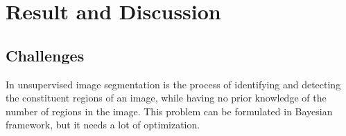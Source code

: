 \chapter{Result and Discussion}
\label{chap:result}
\section{Challenges}
In unsupervised image segmentation is the process of identifying and detecting the constituent regions of an image, while having no prior knowledge of the number of regions in the image. This problem can be formulated in Bayesian framework, but it needs a lot of optimization.

